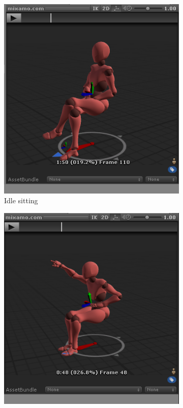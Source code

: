 \documentclass[18pt]{article}
\numberwithin{equation}{section} %
\numberwithin{figure}{section} %
\numberwithin{table}{section} %
\begin{document}
			\begin{figure}[H]
				\centering
				\begin{subfigure}{0.2\textwidth}
					\centering
					\includegraphics[width=1\linewidth]{images/sit}
					\caption{Idle sitting}
				\end{subfigure}
				\begin{subfigure}{0.2\textwidth}
					\centering
					\includegraphics[width=0.96\linewidth]{images/sit_point}

\end{subfigure}
\end{figure}
\end{document}

